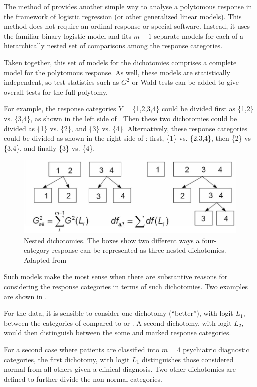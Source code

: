 \documentclass[11pt]{book}
\begin{document}
The method of 
provides another simple way to analyse a polytomous response in the 
framework of logistic regression (or other generalized linear models).
This method does not require an ordinal response or special
software. Instead, it uses the familiar binary logistic model
and fits $m-1$ separate models for each of a hierarchically nested set
of comparisons among the response categories. 

Taken together, this set of models for the dichotomies comprises a
complete model for the polytomous response.  As well, these models
are statistically independent, so test statistics such
as $G^2$ or Wald tests can be added to give overall tests for the
full polytomy.

For example, the response categories
$Y$ = \{1,2,3,4\} could be divided first as \{1,2\} vs. \{3,4\}, as shown in the
left side of .  Then these two
dichotomies could be divided as \{1\} vs. \{2\}, and \{3\} vs. \{4\}.
Alternatively, these response categories could be divided as shown in the
right side of : first, \{1\} vs.
\{2,3,4\}, then \{2\} vs \{3,4\}, and finally \{3\} vs. \{4\}.  
\begin{figure}[htb]
  \centering
  \includegraphics[width=.8\textwidth]{ch07/fig/nested2}
  \caption[Nested dichotomies]{Nested dichotomies.  The boxes show two different ways a four-category response can be represented as three nested dichotomies. Adapted from \citet{Fox:2008}}\label{fig:nested2}
\end{figure}

Such models make the most sense when there are substantive reasons for considering 
the response categories in terms of such dichotomies. Two examples are shown in .
\begin{itemize*}
 \item For the  data, it is sensible to consider one dichotomy (``better''),
with logit $L_1$, 
between the categories of  compared to  or .
A second dichotomy, with logit $L_2$,
would then distinguish between the some and marked response categories.
 \item For a second case where patients are classified into $m=4$ 
 psychiatric diagnostic categories, the first dichotomy, with logit $L_1$
 distinguishes those considered normal from all others given a clinical
 diagnosis.  Two other dichotomies are defined to further divide the
 non-normal categories.
\end{itemize*}
\end{document}
